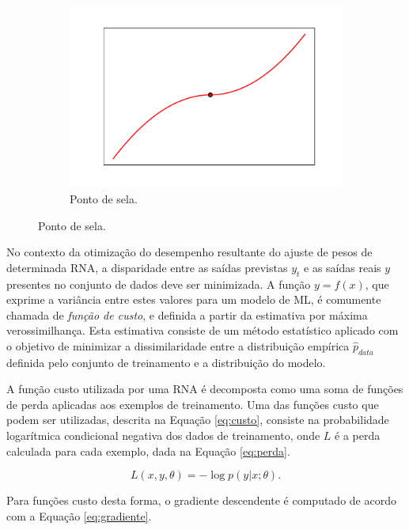 \begin{figure}
\begin{subfigure}[h]{0.3\linewidth}
	\end{subfigure}
	\hfill
	\begin{subfigure}[h]{0.3\linewidth}
		\caption{Ponto de sela.}
		\label{fig:sela}
		\includegraphics[width=\linewidth]{img/saddle}
	\end{subfigure}%
\end{figure}

No contexto da otimização do desempenho resultante do ajuste de pesos de determinada RNA, a disparidade entre as saídas previstas $y_t$ e as saídas reais $y$ presentes no conjunto de dados deve ser minimizada. A função $y=f(x)$, que exprime a variância entre estes valores para um modelo de ML, é comumente chamada de \emph{função de custo}, e definida a partir da estimativa por máxima verossimilhança. Esta estimativa consiste de um método estatístico aplicado com o objetivo de minimizar a dissimilaridade entre a distribuição empírica $\hat{p}_{data}$ definida pelo conjunto de treinamento e a distribuição do modelo.

A função custo utilizada por uma RNA é decomposta como uma soma de funções de perda aplicadas aos exemplos de treinamento. Uma das funções custo que podem ser utilizadas, descrita na Equação \ref{eq:custo}, consiste na probabilidade logarítmica condicional negativa dos dados de treinamento, onde $L$ é a perda calculada para cada exemplo, dada na Equação \ref{eq:perda}.

\begin{equation}\label{eq:perda}
	L(x, y, \theta) = - \log p (y|x;\theta).
\end{equation}

Para funções custo desta forma, o gradiente descendente é computado de acordo com a Equação
\ref{eq:gradiente}.

